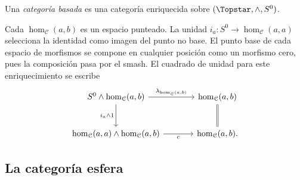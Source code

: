 \begin{defi}
Una \emph{categoría basada} es una categoría enriquecida sobre $(\Topstar,\wedge,S^0)$.
\end{defi}
Cada $\hom_{\mathcal C}(a,b)$ es un espacio punteado. La unidad $i_a\colon S^0\to \hom_{\mathcal C}(a,a)$ selecciona la identidad como imagen del punto no base. El punto base de cada espacio de morfismos se compone en cualquier posición como un morfismo cero, pues la composición pasa por el smash. El cuadrado de unidad para este enriquecimiento se escribe
\[
\begin{tikzcd}[column sep=large,row sep=large]
S^0\wedge \hom_{\mathcal C}(a,b)\arrow[r,"\lambda_{\hom_{\mathcal C}(a,b)}"]\arrow[d,"i_a\wedge1"']&
\hom_{\mathcal C}(a,b)\arrow[d,equal]\\
\hom_{\mathcal C}(a,a)\wedge \hom_{\mathcal C}(a,b)\arrow[r,"c"']&\hom_{\mathcal C}(a,b).
\end{tikzcd}
\]

\subsection{La categoría esfera}

